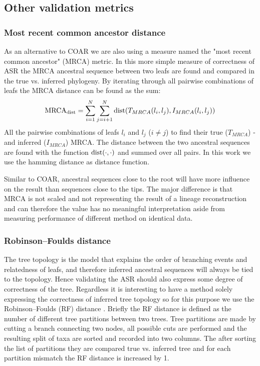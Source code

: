 \subsection{Other validation metrics}

\subsubsection{Most recent common ancestor distance}
As an alternative to COAR we are also using a measure named the "most recent common ancestor" (MRCA) metric.
In this more simple measure of correctness of ASR the MRCA ancestral sequence between two leafs are found and compared in the true vs. inferred phylogeny.
By iterating through all pairwise combinations of leafs the MRCA distance can be found as the sum:
$$
\text{\text{MRCA}}_{\text{dist}} = \sum_{i=1}^{N} \sum_{j=i+1}^{N} \text{dist}(T_{MRCA}(l_i, l_j), I_{MRCA}(l_i, l_j))
$$
All the pairwise combinations of leafs $l_i$ and $l_j$ ($i \neq j$) to find their true ($T_{MRCA}$) -and inferred ($I_{MRCA}$) MRCA.
The distance between the two ancestral sequences are found with the function $\text{dist}(\cdot, \cdot)$ and summed over all pairs.
In this work we use the hamming distance as distance function.

Similar to COAR, ancestral sequences close to the root will have more influence on the result than sequences close to the tips.
The major difference is that MRCA is not scaled and not representing the result of a lineage reconstruction and can therefore the value has no meaningful interpretation aside from measuring performance of different method on identical data.


\subsubsection{Robinson–Foulds distance}
The tree topology is the model that explains the order of branching events and relatedness of leafs, and therefore inferred ancestral sequences will always be tied to the topology.
Hence validating the ASR should also express some degree of correctness of the tree.
Regardless it is interesting to have a method solely expressing the correctness of inferred tree topology so for this purpose we use the Robinson–Foulds (RF) distance \cite{robinson1981comparison}.
Briefly the RF distance is defined as the number of different tree partitions between two trees.
Tree partitions are made by cutting a branch connecting two nodes, all possible cuts are performed and the resulting split of taxa are sorted and recorded into two columns.
The after sorting the list of partitions they are compared true vs. inferred tree and for each partition mismatch the RF distance is increased by 1.



